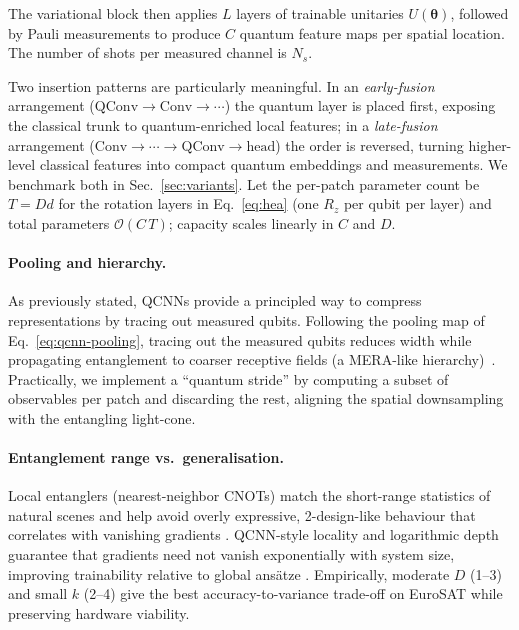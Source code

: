 The variational block then applies
$L$ layers of trainable unitaries $U(\boldsymbol{\theta})$, followed by Pauli measurements to produce
$C$ quantum feature maps per spatial location. The number of shots per measured channel is $N_s$.

Two insertion patterns are particularly meaningful. In an \emph{early-fusion} arrangement ($\mathrm{QConv}\!\to\!\mathrm{Conv}\!\to\!\cdots$) the quantum layer is placed first, exposing the classical trunk to quantum-enriched local features; in a \emph{late-fusion} arrangement ($\mathrm{Conv}\!\to\!\cdots\!\to\!\mathrm{QConv}\!\to\!\text{head}$) the order is reversed, turning higher-level classical features into compact quantum embeddings and measurements. We benchmark both in Sec.~\ref{sec:variants}.
Let the per-patch parameter count be $T\!=\!D d$ for the rotation layers in Eq.~\ref{eq:hea} (one $R_z$ per qubit per layer) and total parameters $\mathcal{O}(C\,T)$; capacity scales linearly in $C$ and $D$.

\paragraph{Pooling and hierarchy.}
As previously stated, QCNNs provide a principled way to compress representations by tracing out measured qubits. Following the pooling map of Eq.~\ref{eq:qcnn-pooling}, tracing out the measured qubits reduces width while propagating entanglement to coarser receptive fields (a MERA-like hierarchy)~\cite{Cong2019}. Practically, we implement a ``quantum stride'' by computing a subset of observables per patch and discarding the rest, aligning the spatial downsampling with the entangling light-cone.

\paragraph{Entanglement range vs.\ generalisation.}
Local entanglers (nearest-neighbor CNOTs) match the short-range statistics of natural scenes and help avoid overly expressive, 2-design-like behaviour that correlates with vanishing gradients \cite{Holmes2022PRXQ}. QCNN-style locality and logarithmic depth guarantee that gradients need not vanish exponentially with system size, improving trainability relative to global ansätze \cite{Pesah2021PRX}. Empirically, moderate $D$ (1–3) and small $k$ (2–4) give the best accuracy-to-variance trade-off on EuroSAT while preserving hardware viability.


